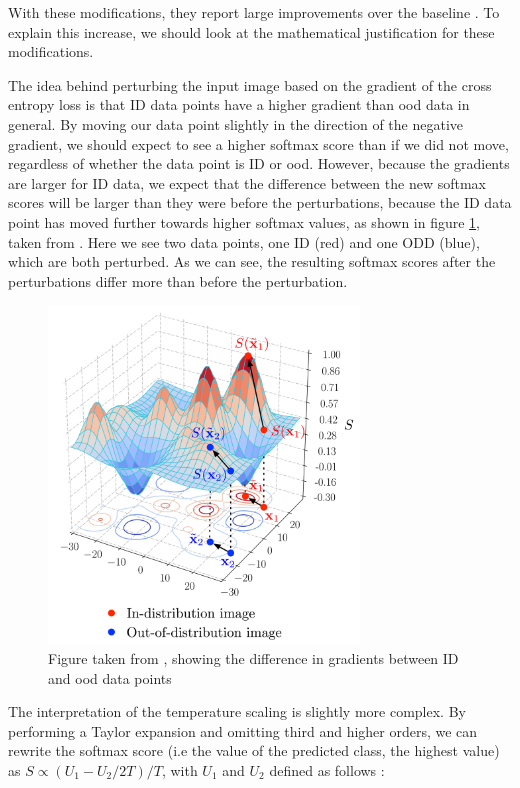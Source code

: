 \documentclass[UKenglish]{uiomasterthesis} %
\theoremstyle{definition}
\begin{document}
With these modifications, they report large improvements over the baseline \cite[4]{odin}. To explain this increase, we should look at the mathematical justification for these modifications.

The idea behind perturbing the input image based on the gradient of the cross entropy loss is that ID data points have a higher gradient than \ac{ood} data in general. By moving our data point slightly in the direction of the negative gradient, we should expect to see a higher softmax score than if we did not move, regardless of whether the data point is ID or \ac{ood}. However, because the gradients are larger for ID data, we expect that the difference between the new softmax scores will be larger than they were before the perturbations, because the ID data point has moved further towards higher softmax values, as shown in figure \ref{softmaxmove}, taken from \cite[8]{odin}. Here we see two data points, one ID (red) and one ODD (blue), which are both perturbed. As we can see, the resulting softmax scores after the perturbations differ more than before the perturbation.

\begin{figure}[h]
\centerline{\includegraphics[width=3.25in]{figure/gradient.png}}
\caption{Figure taken from \cite{odin}, showing the difference in gradients between ID and \ac{ood} data points}
\label{softmaxmove}
\end{figure}

The interpretation of the temperature scaling is slightly more complex. By performing a Taylor expansion and omitting third and higher orders, we can rewrite the softmax score (i.e the value of the predicted class, the highest value) as ${S\propto {(U_{1}-U_{2}/2T)/T}}$, with $U_1$ and $U_2$ defined as follows \cite[4]{odin}:
\end{document}
